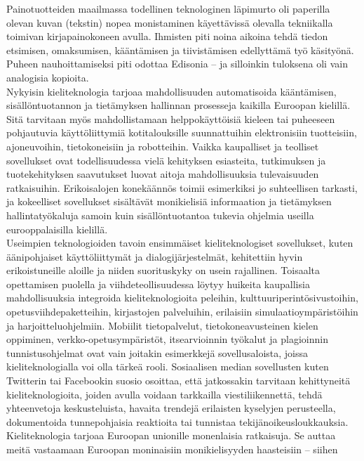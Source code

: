 \begin{multicols}{2}
Painotuotteiden maailmassa todellinen teknologinen läpimurto oli paperilla
olevan kuvan (tekstin) nopea monistaminen käyettävissä olevalla tekniikalla toimivan
kirjapainokoneen avulla. Ihmisten piti noina aikoina tehdä tiedon etsimisen,
omaksumisen, kääntämisen ja tiivistämisen edellyttämä työ käsityönä. Puheen
nauhoittamiseksi piti odottaa Edisonia – ja silloinkin tuloksena oli
vain analogisia kopioita.\\
Nykyisin kieliteknologia tarjoaa mahdollisuuden automatisoida kääntämisen,
sisällöntuotannon ja tietämyksen hallinnan prosesseja kaikilla Euroopan
kielillä. Sitä tarvitaan myös mahdollistamaan helppokäyttöisiä kieleen tai
puheeseen pohjautuvia käyttöliittymiä kotitalouksille suunnattuihin
elektronisiin tuotteisiin, ajoneuvoihin, tietokoneisiin ja robotteihin. Vaikka
kaupalliset ja teolliset sovellukset ovat todellisuudessa vielä kehityksen
esiasteita, tutkimuksen ja tuotekehityksen saavutukset luovat aitoja
mahdollisuuksia tulevaisuuden ratkaisuihin. Erikoisalojen konekäännös toimii
esimerkiksi jo suhteellisen tarkasti, ja kokeelliset sovellukset sisältävät
monikielisiä informaation ja tietämyksen hallintatyökaluja samoin kuin
sisällöntuotantoa tukevia ohjelmia useilla eurooppalaisilla kielillä.\\
Useimpien teknologioiden tavoin ensimmäiset kieliteknologiset sovellukset,
kuten äänipohjaiset käyttöliittymät ja dialogijärjestelmät, kehitettiin hyvin
erikoistuneille aloille ja niiden suorituskyky on usein rajallinen. Toisaalta
opettamisen puolella ja viihdeteollisuudessa löytyy huikeita kaupallisia
mahdollisuuksia integroida kieliteknologioita peleihin,
kulttuuriperintösivustoihin, opetusviihdepaketteihin, kirjastojen palveluihin, erilaisiin 
simulaatioympäristöihin ja harjoitteluohjelmiin. Mobiilit tietopalvelut,
tietokoneavusteinen kielen oppiminen, verkko-opetusympäristöt, itsearvioinnin
työkalut ja plagioinnin tunnistusohjelmat ovat vain joitakin esimerkkejä
sovellusaloista, joissa kieliteknologialla voi olla tärkeä rooli. Sosiaalisen
median sovellusten kuten Twitterin tai Facebookin suosio osoittaa, että
jatkossakin tarvitaan kehittyneitä kieliteknologioita, joiden avulla voidaan
tarkkailla viestiliikennettä, tehdä yhteenvetoja keskusteluista, havaita
trendejä erilaisten kyselyjen perusteella, dokumentoida tunnepohjaisia reaktioita tai tunnistaa 
tekijänoikeusloukkauksia.\\
Kieliteknologia tarjoaa Euroopan unionille monenlaisia ratkaisuja. Se auttaa
meitä vastaamaan Euroopan moninaisiin monikielisyyden haasteisiin – siihen

\end{multicols}
